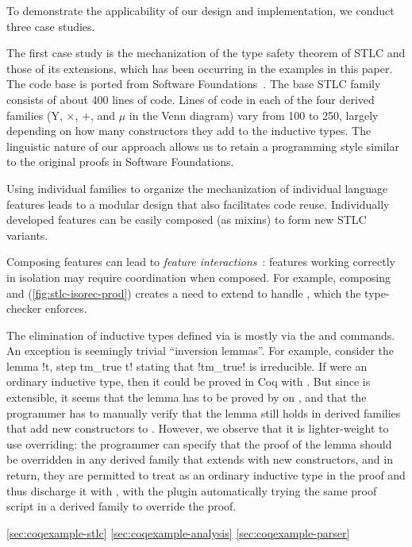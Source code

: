 To demonstrate the applicability of our design and implementation, we
conduct three case studies.



The first case study is the mechanization of the type safety theorem of
STLC and those of its extensions,
which has been occurring in the examples in this paper.
The code base is ported from Software Foundations~\cite{sf-pl}.
%
The base STLC family consists of about 400 lines of code.
Lines of code in each of the four derived families
($\mathrm{Y}$, $\times$, $+$, and $\mu$ in the Venn diagram)
vary from 100 to 250, largely depending on how many constructors they
add to the inductive types.
%
The linguistic nature of our approach allows us to retain a programming
style similar to the original proofs in Software Foundations.



Using individual families to organize the mechanization of individual
language features leads to a modular design that also facilitates code reuse.
%
Individually developed features can be easily composed (as mixins) to
form new STLC variants.

Composing features can lead to \emph{feature interactions}~\cite{batory2011feature}:
features working correctly in isolation may require coordination when composed.
For example, composing  and 
(\cref{fig:stlc-isorec-prod}) creates a need to extend  to
handle , which the type-checker enforces.

The elimination of inductive types defined via  is
mostly via the  and  commands.
An exception is seemingly trivial ``inversion lemmas''.
For example, consider the lemma \lsti!\forall t, \neg step tm_true t!
stating that \lsti!tm_true! is irreducible.
If  were an ordinary inductive type, then it could be proved in Coq
with .
But since  is extensible, it seems that the lemma has to be
proved by  on , and that the programmer
has to manually verify that the lemma still holds in derived families
that add new constructors to .
%
However, we observe that it is lighter-weight to use overriding: 
the programmer can specify that the proof of the lemma should be overridden
in any derived family that extends  with new constructors,
and in return, they are permitted to treat  as an ordinary
inductive type in the proof and thus discharge it with ,
with the plugin automatically trying the same proof script in a derived
family to override the proof.


\bigskip 

\cref{sec:coqexample-stlc}
\cref{sec:coqexample-analysis}
\cref{sec:coqexample-parser}